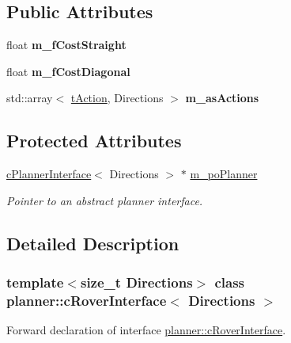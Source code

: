 \subsection*{Public Attributes}
\begin{DoxyCompactItemize}
\item 
\mbox{\label{classplanner_1_1c_rover_interface_a8378fd644c70195336ffdb6a61b14884}} 
float {\bfseries m\+\_\+f\+Cost\+Straight}
\item 
\mbox{\label{classplanner_1_1c_rover_interface_a622dc2ed266037b2b50dbbd9227c0cc0}} 
float {\bfseries m\+\_\+f\+Cost\+Diagonal}
\item 
\mbox{\label{classplanner_1_1c_rover_interface_a119c31cfd1e6aa72921fc5185e6f44a5}} 
std\+::array$<$ \mbox{\hyperlink{structplanner_1_1t_action}{t\+Action}}, Directions $>$ {\bfseries m\+\_\+as\+Actions}
\end{DoxyCompactItemize}
\subsection*{Protected Attributes}
\begin{DoxyCompactItemize}
\item 
\mbox{\hyperlink{classplanner_1_1c_planner_interface}{c\+Planner\+Interface}}$<$ Directions $>$ $\ast$ \mbox{\hyperlink{classplanner_1_1c_rover_interface_a8e1ffb06f3301b9440da125666ecdc4f}{m\+\_\+po\+Planner}}
\begin{DoxyCompactList}\small\item\em Pointer to an abstract planner interface. \end{DoxyCompactList}\end{DoxyCompactItemize}


\subsection{Detailed Description}
\subsubsection*{template$<$size\+\_\+t Directions$>$\newline
class planner\+::c\+Rover\+Interface$<$ Directions $>$}

Forward declaration of interface \mbox{\hyperlink{classplanner_1_1c_rover_interface}{planner\+::c\+Rover\+Interface}}. 

